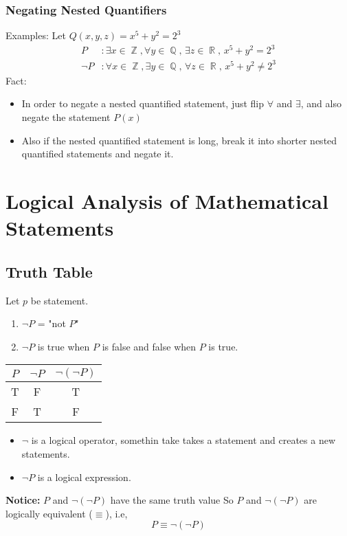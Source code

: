 \documentclass[11pt, a4paper]{memoir}
\DeclareMathOperator{\Q}{{\mathbb{Q}}}
\DeclareMathOperator{\Z}{{\mathbb{Z}}}
\DeclareMathOperator{\R}{{\mathbb{R}}}
\theoremstyle{change}
\theoremstyle{plain}
\theoremstyle{nonumberplain}
\numberwithin{equation}{section}
\begin{document}
\subsection{Negating Nested Quantifiers}
Examples: 
Let $Q(x, y, z) = x^5 + y^2 = 2^3$\\
\begin{align*}
    P&: \exists x \in \Z, \forall y \in \Q, \, \exists z \in \R, \, x^5 + y^2 = 2^3\\
    \neg P&: \forall x \in \Z, \exists y \in \Q, \, \forall z \in \R, \, x^5 + y^2 \ne 2^3
\end{align*}
Fact: 
\begin{itemize}
    \item In order to negate a nested quantified statement, just flip $\forall$ and $\exists$, and also negate the statement $P(x)$
    \item Also if the nested quantified statement is long, break it into shorter nested quantified statements and negate it.
\end{itemize}


\chapter{Logical Analysis of Mathematical Statements}
\section{Truth Table}
Let $p$ be statement. 
\begin{enumerate}
    \item $\neg P$ = "not $P$"
    \item $\neg P$ is true when $P$ is false and false when $P$ is true.
\end{enumerate}

\begin{table}[ht]
\centering
\begin{tabular}{|c|c|c|}
    \hline
    $P$ & $\neg P$ & $\neg (\neg P)$ \\
    \hline
    T & F & T \\
    \hline
    F & T & F \\
    \hline
\end{tabular}
\end{table}

\begin{itemize}
    \item $\neg$ is a logical operator, somethin take takes a statement and creates a new statements.
    \item $\neg P$ is a logical expression.
\end{itemize}
\textbf{Notice:} $P$ and $\neg(\neg P)$ have the same truth value So $P$ and $\neg (\neg P)$ are logically equivalent ($\equiv$), i.e, 
$$P \equiv \neg (\neg P)$$ 
\end{document}
